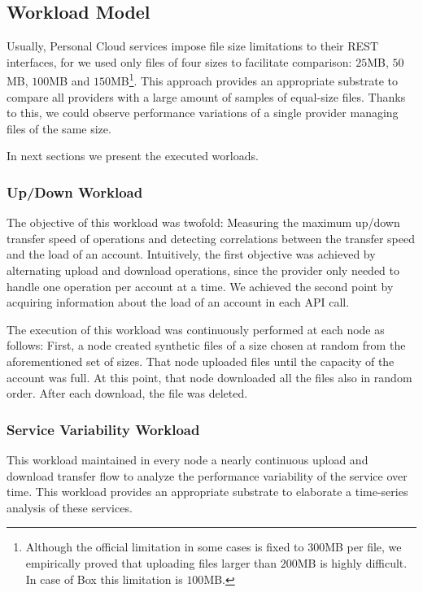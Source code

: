 \subsection{Workload Model} 

Usually, Personal Cloud services impose file size 
limitations to their REST interfaces, for
we used only files of four sizes to facilitate comparison: $25$MB, $50$MB, 
$100$MB and $150$MB\footnote{Although the official limitation in some cases is fixed
to $300$MB per file, we empirically proved that uploading files
larger than $200$MB is highly difficult. In case of Box this limitation
is $100$MB.}. This approach provides an appropriate substrate 
to compare all providers with a large amount of samples of equal-size files.
Thanks to this, we could observe performance variations of a single provider
managing files of the same size.

In next sections we present the executed worloads.

\subsubsection*{Up/Down Workload}
The objective of this workload
was twofold: Measuring the maximum up/down transfer speed of operations
and detecting correlations between the transfer speed and the load
of an account. Intuitively, the first objective was achieved by alternating upload
and download operations, since the provider only needed to handle one 
operation per account at a time. We achieved the second point
by acquiring information about the load of an account in each API call.

The execution of this workload was continuously performed
at each node as follows: First, a node created synthetic 
files of a size chosen at random from the aforementioned set of sizes.
That node uploaded files until the capacity of the account was full.
At this point, that node downloaded all the files also in random order.
After each download, the file was deleted. 

\subsubsection*{Service Variability Workload}
This workload maintained 
in every node a nearly continuous upload and download transfer flow to analyze the performance 
variability of the service over time. This workload provides an
appropriate substrate to elaborate a time-series analysis of these services.

